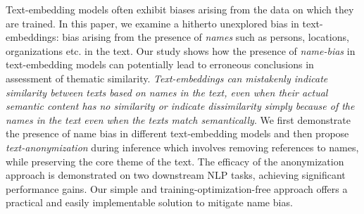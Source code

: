 Text-embedding models often exhibit biases arising from the data on which they are trained. In this paper, we examine a hitherto unexplored bias in text-embeddings: bias arising from the  presence of \textit{names} such as persons, locations, organizations etc. in the text. Our study shows how the presence of \textit{name-bias} in text-embedding models can potentially lead to erroneous conclusions in  assessment of thematic similarity. {\em Text-embeddings can mistakenly indicate similarity between texts based on names in the text, even when their actual semantic content has no similarity or indicate dissimilarity simply because of the names in the text even when the texts match semantically}. We first demonstrate the presence of name bias in different text-embedding models and then propose \textit{text-anonymization} during inference which involves removing references to names, while preserving the core theme of the text. The efficacy of the anonymization approach is demonstrated on two downstream NLP tasks, achieving significant performance gains. Our simple and training-optimization-free approach offers a practical and easily implementable solution to mitigate name bias.
